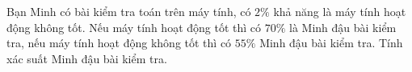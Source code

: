 \begin{ex}
Bạn Minh có bài kiểm tra toán trên máy tính, có $2\%$ khả năng là máy tính hoạt động không tốt. Nếu máy tính hoạt động tốt thì có $70\%$ là Minh đậu bài kiểm tra, nếu máy tính hoạt động không tốt thì có $55\%$ Minh đậu bài kiểm tra. Tính xác suất Minh đậu bài kiểm tra.
\end{ex}
